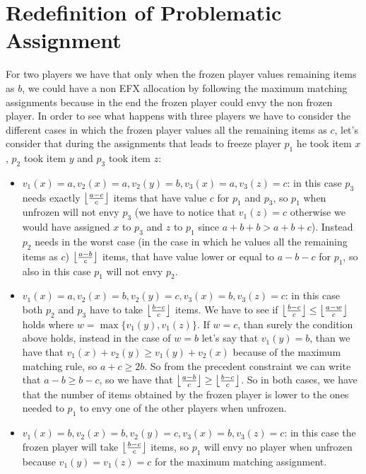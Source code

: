 \section{Redefinition of Problematic Assignment}
For two players we have that only when the frozen player values remaining items as $b$, we could have a non EFX allocation by following the maximum matching assignments because in the end the frozen player could envy the non frozen player. In order to see what happens with three players we have to consider the different cases in which the frozen player values all the remaining items as $c$, let's consider that during the assignments that leads to freeze player $p_1$ he took item $x$, $p_2$ took item $y$ and $p_3$ took item $z$: 
\begin{itemize}
    \item $v_1(x) = a, v_2(x) = a, v_2(y) = b, v_3(x) = a, v_3(z) = c$: in this case $p_3$ needs exactly $\left \lfloor\frac{a-c}{c}\right \rfloor$ items that have value $c$ for $p_1$ and $p_3$, so $p_1$ when unfrozen will not envy $p_3$ (we have to notice that $v_1(z) = c$ otherwise we would have assigned $x$ to $p_3$ and $z$ to $p_1$ since $a + b + b > a + b + c$). Instead $p_2$ needs in the worst case (in the case in which he values all the remaining items as $c$) $\left \lfloor\frac{a-b}{c}\right \rfloor$ items, that have value lower or equal to $a-b-c$ for $p_1$, so also in this case $p_1$ will not envy $p_2$.
    
    \item $v_1(x) = a, v_2(x) = b, v_2(y) = c, v_3(x) = b, v_3(z) = c$: in this case both $p_2$ and $p_3$ have to take $\left \lfloor\frac{b-c}{c}\right \rfloor$ items. We have to see if $\left \lfloor\frac{b-c}{c}\right \rfloor\le \left \lfloor\frac{a-w}{c}\right \rfloor$ holds where $w=\max\{v_1(y), v_1(z)\}$. If $w=c$, than surely the condition above holds, instead in the case of $w=b$ let's say that $v_1(y) = b$, than we have that $v_1(x) + v_2(y) \ge v_1(y) + v_2(x)$ because of the maximum matching rule, so $a + c \ge 2b$. So from the precedent constraint we can write that $a -b \ge b-c$, so we have that $\left \lfloor\frac{a-b}{c}\right \rfloor \ge \left \lfloor\frac{b-c}{c}\right \rfloor$. So in both cases, we have that the number of items obtained by the frozen player is lower to the ones needed to $p_1$ to envy one of the other players when unfrozen.
    
    \item $v_1(x) = b, v_2(x) = b, v_2(y) = c, v_3(x) = b, v_3(z) = c$: in this case the frozen player will take $\left \lfloor\frac{b-c}{c}\right \rfloor$ items, so $p_1$ will envy no player when unfrozen because $v_1(y) = v_1(z) = c$ for the maximum matching assignment.
\end{itemize}
